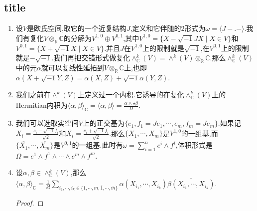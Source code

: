 \subsection{title}

\begin{enumerate}
	\item 设$V$是欧氏空间,取它的一个近复结构$J$,定义和它伴随的2形式为$\omega=\langle J-.-\rangle$.我们有复化$V\otimes_{\mathbb{R}}\mathbb{C}$的分解为$V^{1,0}\oplus V^{0,1}$,其中$V^{1,0}=\{X-\sqrt{-1}JX\mid X\in V\}$和$V^{0,1}=\{X+\sqrt{-1}X\mid X\in V\}$.并且$J$在$V^{1,0}$上的限制就是$\sqrt{-1}$,在$V^{0,1}$上的限制就是$-\sqrt{-1}$.我们再把交错形式做复化$\wedge_{\mathbb{C}}^k(V)=\wedge^k(V)\otimes_{\mathbb{R}}\mathbb{C}$.那么$\wedge_{\mathbb{C}}^k(V)$中的元$\alpha$就可以复线性延拓到$V\otimes_{\mathbb{R}}\mathbb{C}$上,也即$\alpha(X+\sqrt{-1}Y,Z)=\alpha(X,Z)+\sqrt{-1}\alpha(Y,Z)$.
	\item 我们之前在$\wedge^k(V)$上定义过一个内积.它诱导的在复化$\wedge_{\mathbb{C}}^k(V)$上的Hermitian内积为$\langle\alpha,\beta\rangle_{\mathbb{C}}=\langle\alpha,\overline{\beta}\rangle=\frac{\alpha\wedge\star\overline{\beta}}{\Omega}$.
	\item 我们可以选取实空间$V$上的正交基为$\{e_1,f_1=Je_1,\cdots,e_m,f_m=Je_m\}$.如果记$X_i=\frac{e_i-\sqrt{-1}f_i}{\sqrt{2}}$和$\overline{X_i}=\frac{e_i+\sqrt{-1}f_i}{\sqrt{2}}$.那么$\{X_1,\cdots,X_m\}$是$V^{1,0}$的一组基,而$\{\overline{X_1},\cdots,\overline{X_m}\}$是$V^{0,1}$的一组基.此时有$\omega=\sum_{i=1}^ne^i\wedge f^i$,体积形式是$\Omega=e^1\wedge f^1\wedge\cdots\wedge e^m\wedge f^m$.
	\item 设$\alpha,\beta\in\wedge_{\mathbb{C}}^k(V)$,那么$\langle\alpha,\beta\rangle_{\mathbb{C}}=\frac{1}{k!}\sum_{i_1,\cdots,i_k\in\{1,\cdots,m,\overline{1},\cdots,\overline{m}\}}\alpha(X_{i_1},\cdots,X_{i_k})\overline{\beta(X_{i_1},\cdots,X_{i_k})}$.
	\begin{proof}
		

\end{proof}
\end{enumerate}
